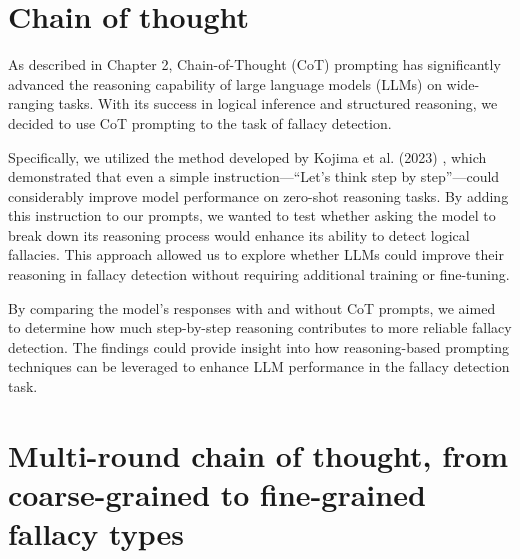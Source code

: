 \section{Chain of thought}

As described in Chapter 2, Chain-of-Thought (CoT) prompting has significantly advanced the reasoning capability of large language models (LLMs) on wide-ranging tasks. With its success in logical inference and structured reasoning, we decided to use CoT prompting to the task of fallacy detection.

Specifically, we utilized the method developed by Kojima et al. (2023) \cite{kojima2022large}, which demonstrated that even a simple instruction—“Let’s think step by step”—could considerably improve model performance on zero-shot reasoning tasks. By adding this instruction to our prompts, we wanted to test whether asking the model to break down its reasoning process would enhance its ability to detect logical fallacies. This approach allowed us to explore whether LLMs could improve their reasoning in fallacy detection without requiring additional training or fine-tuning.

By comparing the model’s responses with and without CoT prompts, we aimed to determine how much step-by-step reasoning contributes to more reliable fallacy detection. The findings could provide insight into how reasoning-based prompting techniques can be leveraged to enhance LLM performance in the fallacy detection task.



\section{Multi-round chain of thought, from coarse-grained to fine-grained fallacy types}


